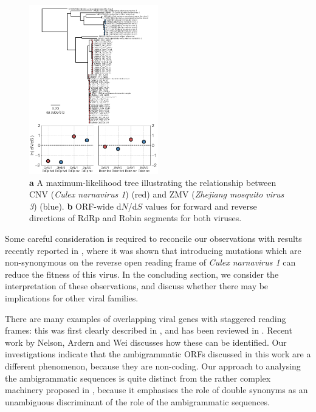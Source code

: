 \documentclass[unnumsec,webpdf,contemporary,large,namedate]{oup-authoring-template}%
\theoremstyle{thmstyleone}%
\theoremstyle{thmstyletwo}%
\theoremstyle{thmstylethree}%
\begin{document}
\begin{figure}
\begin{center}
\includegraphics[width=0.5\textwidth]{narna-zhcx.png}
\caption{\label{fig: 1}
{\bf a} A maximum-likelihood tree illustrating the relationship between CNV (\emph{Culex narnavirus 1}) (red) and
ZMV (\emph{Zhejiang mosquito virus 3}) (blue). {\bf b} ORF-wide d$N$/d$S$ values for forward and 
reverse directions of RdRp and Robin segments for both viruses.
}
\end{center}
\end{figure}

Some careful consideration is required to reconcile our observations with results recently reported
in \cite{Ret+20}, where it was shown that introducing mutations which are non-synonymous on the reverse
open reading frame of \emph{Culex narnavirus 1} can reduce the fitness of this virus.
In the concluding section, we consider the interpretation of these observations, and discuss whether there
may be implications for other viral families.

There are many examples of overlapping viral genes with staggered reading frames: this was first
clearly described in \cite{Bar+76}, and has been reviewed in \cite{Chi+10}. Recent
work by Nelson, Ardern and Wei \citep{Nel+20} discusses how these can be identified.
Our investigations indicate that the ambigrammatic ORFs discussed in this work are a
different phenomenon, because they are non-coding. Our approach to analysing the ambigrammatic
sequences is quite distinct from the rather complex machinery proposed in \cite{Nel+20}, because
it emphasises the role of double synonyms as an unambiguous discriminant of the role of the ambigrammatic
sequences.
\end{document}
